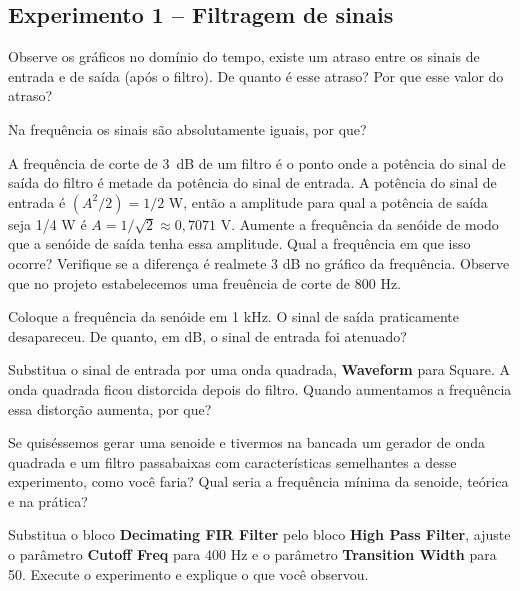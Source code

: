 \documentclass[12pt,addpoints]{exam}
\begin{document}
\subsection*{Experimento 1 -- Filtragem de sinais}

\begin{questions}
    \question Observe os gráficos no domínio do tempo, existe um atraso entre os sinais de entrada e de saída (após o filtro). De quanto é esse atraso? Por que esse valor do atraso?
    \fillwithlines{0.5in}
    
    \question Na frequência os sinais são absolutamente iguais, por que?
    \fillwithlines{0.5in}

    \question A frequência de corte de 3~dB de um filtro é o ponto onde a potência do sinal de saída do filtro é metade da potência do sinal de entrada. A potência do sinal de entrada é $(A^2/2) = 1/2$ W, então a amplitude para qual a potência de saída seja 1/4 W é $A = 1/\sqrt{2} \approx 0,7071$ V. Aumente a frequência da senóide de  modo que a senóide de saída tenha essa amplitude. Qual a frequência em que isso ocorre? Verifique se a diferença é realmete 3 dB no gráfico da frequência. Observe que no projeto estabelecemos uma freuência de corte de 800 Hz.
    \fillwithlines{1.0in}
    
    \question Coloque a frequência da senóide em 1 kHz. O sinal de saída praticamente desapareceu. De quanto, em dB, o sinal de entrada foi atenuado?
    \fillwithlines{0.5in}

    \question Substitua o sinal de entrada por uma onda quadrada, \textbf{Waveform} para Square. A onda quadrada ficou distorcida depois do filtro. Quando aumentamos a frequência essa distorção aumenta, por que?
    \fillwithlines{0.5in}
    
    
    \question Se quiséssemos gerar uma senoide e tivermos na bancada um gerador de onda quadrada e um filtro passabaixas com características semelhantes a desse experimento, como você faria? Qual seria a frequência mínima da senoide, teórica e na prática?
    \fillwithlines{1.0in}

    \question Substitua o bloco \textbf{Decimating FIR Filter} pelo bloco \textbf{High Pass Filter}, ajuste o parâmetro \textbf{Cutoff Freq} para 400 Hz e o parâmetro \textbf{Transition Width} para 50. Execute o experimento e explique o que você observou.
    \fillwithlines{0.5in}
    

\end{questions}
\end{document}

